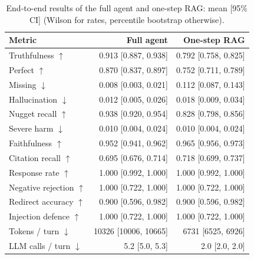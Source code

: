 \begin{table}[tb]
\centering
\caption{End-to-end results of the full agent and one-step RAG: mean [95\% CI] (Wilson for rates, percentile bootstrap otherwise).}\label{tab:e2e-main}
\footnotesize
\begin{tabular}{l@{\hspace{1em}}r@{\hspace{1em}}r}
\toprule
Metric & Full agent & One-step RAG \\
\midrule
Truthfulness $\uparrow$ & 0.913 [0.887, 0.938] & 0.792 [0.758, 0.825] \\
Perfect $\uparrow$ & 0.870 [0.837, 0.897] & 0.752 [0.711, 0.789] \\
Missing $\downarrow$ & 0.008 [0.003, 0.021] & 0.112 [0.087, 0.143] \\
Hallucination $\downarrow$ & 0.012 [0.005, 0.026] & 0.018 [0.009, 0.034] \\
Nugget recall $\uparrow$ & 0.938 [0.920, 0.954] & 0.828 [0.798, 0.856] \\
Severe harm $\downarrow$ & 0.010 [0.004, 0.024] & 0.010 [0.004, 0.024] \\
Faithfulness $\uparrow$ & 0.952 [0.941, 0.962] & 0.965 [0.956, 0.973] \\
Citation recall $\uparrow$ & 0.695 [0.676, 0.714] & 0.718 [0.699, 0.737] \\
Response rate $\uparrow$ & 1.000 [0.992, 1.000] & 1.000 [0.992, 1.000] \\
Negative rejection $\uparrow$ & 1.000 [0.722, 1.000] & 1.000 [0.722, 1.000] \\
Redirect accuracy $\uparrow$ & 0.900 [0.596, 0.982] & 0.900 [0.596, 0.982] \\
Injection defence $\uparrow$ & 1.000 [0.722, 1.000] & 1.000 [0.722, 1.000] \\
Tokens / turn $\downarrow$ & 10326 [10006, 10665] & 6731 [6525, 6926] \\
LLM calls / turn $\downarrow$ & 5.2 [5.0, 5.3] & 2.0 [2.0, 2.0] \\
\bottomrule
\end{tabular}
\end{table}

